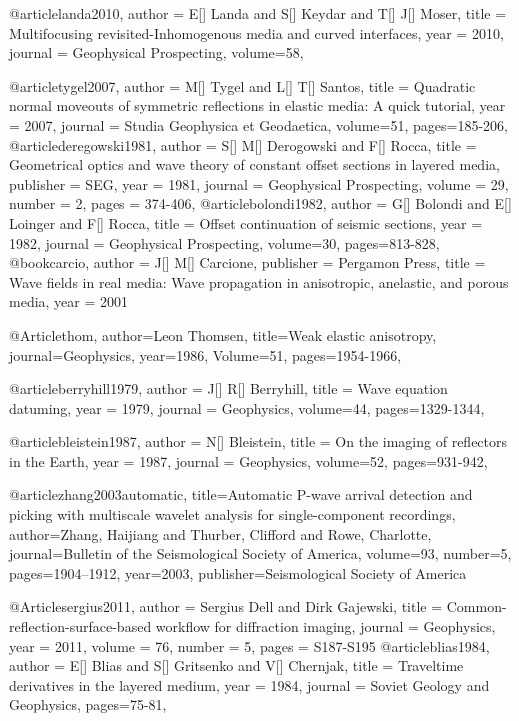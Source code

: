 {@article{landa2010,
  author =	 {E[] Landa and S[] Keydar and T[] J[] Moser},
  title =	 {Multifocusing revisited-Inhomogenous media and curved interfaces},
  year =	 2010,
  journal =	 {Geophysical Prospecting},
  volume={58},
}

@article{tygel2007,
  author =	 {M[] Tygel and L[] T[] Santos},
  title =	 {Quadratic normal moveouts of symmetric reflections in elastic media: A quick tutorial},
  year =	 2007,
  journal =	 {Studia Geophysica et Geodaetica},
  volume={51},
 pages=185-206,
}
@article{deregowski1981,
  author =	 {S[] M[] Derogowski and F[] Rocca},
  title =	 {Geometrical optics and wave theory of constant offset sections in layered media},
  publisher =	 {SEG},
  year =	 1981,
  journal =	 {Geophysical Prospecting},
  volume =	 29,
  number =	 2,
  pages =	 {374-406},
}
@article{bolondi1982,
  author =	 {G[] Bolondi and E[] Loinger and F[] Rocca},
  title =	 {Offset continuation of seismic sections},
  year =	 1982,
  journal =	 {Geophysical Prospecting},
  volume={30},
 pages=813-828,
}
@book{carcio,
   author = {J[] M[] Carcione},
   publisher = {Pergamon Press},
   title = {Wave fields in real media: Wave propagation in anisotropic, anelastic, and porous media},
   year = {2001}
}

@Article{thom,
  author={Leon Thomsen},
  title={Weak elastic anisotropy},
  journal={Geophysics},
  year=1986,
  Volume=51,
  pages={1954-1966},
}


@article{berryhill1979,
  author =	 {J[] R[] Berryhill},
  title =	 {Wave equation datuming},
  year =	 1979,
  journal =	 {Geophysics},
  volume={44},
 pages=1329-1344,
}

@article{bleistein1987,
  author =	 {N[] Bleistein},
  title =	 {On the imaging of reflectors in the Earth},
  year =	 1987,
  journal =	 {Geophysics},
  volume={52},
 pages=931-942,
}

@article{zhang2003automatic,
  title={Automatic P-wave arrival detection and picking with multiscale wavelet analysis for single-component recordings},
  author={Zhang, Haijiang and Thurber, Clifford and Rowe, Charlotte},
  journal={Bulletin of the Seismological Society of America},
  volume={93},
  number={5},
  pages={1904--1912},
  year={2003},
  publisher={Seismological Society of America}
}

@Article{sergius2011,
  author =       {Sergius Dell and Dirk Gajewski},
  title =     {Common-reflection-surface-based workflow for diffraction imaging}, 
  journal = {Geophysics},
  year =         2011,
  volume =       76,
  number =       5,
  pages =        {S187-S195}
}
@article{blias1984,
  author =	 {E[] Blias and S[] Gritsenko and V[] Chernjak},
  title =	 {Traveltime derivatives in the layered medium},
  year =	 1984,
  journal =	 {Soviet Geology and Geophysics},
 pages=75-81,
}

}
